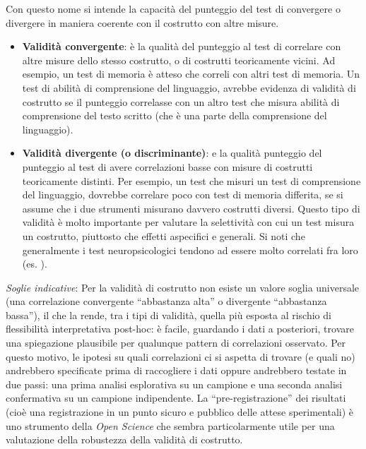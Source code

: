 \documentclass[
  italian,
  letterpaper,
  paper=A4,
  headinclude=on,
  footinclude=on,
  12pt]{scrbook}
\begin{document}
Con questo nome si intende la capacità del punteggio del test di
convergere o divergere in maniera coerente con il costrutto con altre
misure.

\begin{itemize}
\item
  \textbf{Validità convergente}: è la qualità del punteggio al test di
  correlare con altre misure dello stesso costrutto, o di costrutti
  teoricamente vicini. Ad esempio, un test di memoria è atteso che
  correli con altri test di memoria. Un test di abilità di comprensione
  del linguaggio, avrebbe evidenza di validità di costrutto se il
  punteggio correlasse con un altro test che misura abilità di
  comprensione del testo scritto (che è una parte della comprensione del
  linguaggio).
\item
  \textbf{Validità divergente (o discriminante)}: e la qualità punteggio
  del punteggio al test di avere correlazioni basse con misure di
  costrutti teoricamente distinti. Per esempio, un test che misuri un
  test di comprensione del linguaggio, dovrebbe correlare poco con test
  di memoria differita, se si assume che i due strumenti misurano
  davvero costrutti diversi. Questo tipo di validità è molto importante
  per valutare la selettività con cui un test misura un costrutto,
  piuttosto che effetti aspecifici e generali. Si noti che generalmente
  i test neuropsicologici tendono ad essere molto correlati fra loro
  (es. \cite{trevino2021attention,mondini2011enb2}).
\end{itemize}

\emph{Soglie indicative}: Per la validità di costrutto non esiste un
valore soglia universale (una correlazione convergente ``abbastanza
alta'' o divergente ``abbastanza bassa''), il che la rende, tra i tipi
di validità, quella più esposta al rischio di flessibilità
interpretativa post-hoc: è facile, guardando i dati a posteriori,
trovare una spiegazione plausibile per qualunque pattern di correlazioni
osservato. Per questo motivo, le ipotesi su quali correlazioni ci si
aspetta di trovare (e quali no) andrebbero specificate prima di
raccogliere i dati oppure andrebbero testate in due passi: una prima
analisi esplorativa su un campione e una seconda analisi confermativa su
un campione indipendente. La ``pre-registrazione'' dei risultati (cioè
una registrazione in un punto sicuro e pubblico delle attese
sperimentali) è uno strumento della \emph{Open Science} che sembra
particolarmente utile per una valutazione della robustezza della
validità di costrutto.
\end{document}
